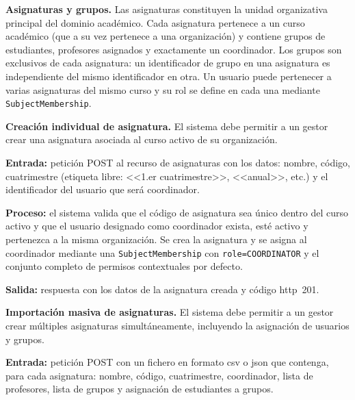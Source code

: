 
\item \textbf{Asignaturas y grupos.} \label{rf:subjects}
Las asignaturas constituyen la unidad organizativa principal del dominio académico. Cada
asignatura pertenece a un curso académico (que a su vez pertenece a una organización) y
contiene grupos de estudiantes, profesores asignados y exactamente un coordinador. Los
grupos son exclusivos de cada asignatura: un identificador de grupo en una asignatura es
independiente del mismo identificador en otra. Un usuario puede pertenecer a varias
asignaturas del mismo curso y su rol se define en cada una mediante
\texttt{SubjectMembership}.

\begin{functional}

    \item \textbf{Creación individual de asignatura.} \label{rf:subjects:create}
    El sistema debe permitir a un gestor crear una asignatura asociada al curso activo de
    su organización.

    \textbf{Entrada:} petición POST al recurso de asignaturas con los datos: nombre,
    código, cuatrimestre (etiqueta libre: <<1.er cuatrimestre>>, <<anual>>, etc.) y el
    identificador del usuario que será coordinador.

    \textbf{Proceso:} el sistema valida que el código de asignatura sea único dentro del
    curso activo y que el usuario designado como coordinador exista, esté activo y
    pertenezca a la misma organización. Se crea la asignatura y se asigna al coordinador
    mediante una \texttt{SubjectMembership} con \texttt{role=COORDINATOR} y el conjunto
    completo de permisos contextuales por defecto.

    \textbf{Salida:} respuesta con los datos de la asignatura creada y código
    \acs{http}~201.

    \item \textbf{Importación masiva de asignaturas.} \label{rf:subjects:import}
    El sistema debe permitir a un gestor crear múltiples asignaturas simultáneamente,
    incluyendo la asignación de usuarios y grupos.

    \textbf{Entrada:} petición POST con un fichero en formato \acs{csv} o \acs{json} que
    contenga, para cada asignatura: nombre, código, cuatrimestre, coordinador, lista de
    profesores, lista de grupos y asignación de estudiantes a grupos.


\end{functional}
